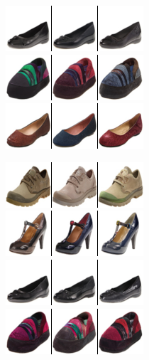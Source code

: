 \begin{figure}[t]
\begin{subfigure}[t]{0.25\textwidth}
      \includegraphics[height=\edgesstuffimgheight]{figs/cigcvae/image-samples/shoes/image_aipo_2_t=0.85_imagenet_samples.png}
      \includegraphics[height=\edgesstuffimgheight]{figs/cigcvae/image-samples/shoes/image_aipo_3_t=0.85_imagenet_samples.png}
      \includegraphics[height=\edgesstuffimgheight]{figs/cigcvae/image-samples/shoes/image_aipo_4_t=0.85_imagenet_samples.png}
      \caption{\scriptsize {}}
    \end{subfigure}
    \begin{subfigure}[t]{0.25\textwidth}
      \centering
      \includegraphics[height=\edgesstuffimgheight]{figs/cigcvae/image-samples/shoes/image_aipo_0_imagenet_samples.png}
      \includegraphics[height=\edgesstuffimgheight]{figs/cigcvae/image-samples/shoes/image_aipo_1_imagenet_samples.png}
      \includegraphics[height=\edgesstuffimgheight]{figs/cigcvae/image-samples/shoes/image_aipo_2_imagenet_samples.png}
      \includegraphics[height=\edgesstuffimgheight]{figs/cigcvae/image-samples/shoes/image_aipo_3_imagenet_samples.png}

\end{subfigure}
\end{figure}
